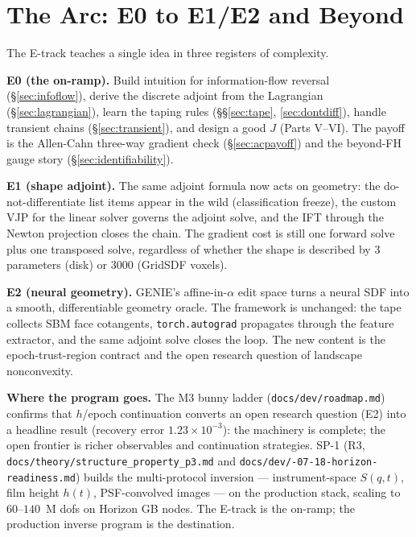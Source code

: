 \documentclass[11pt]{article}
\begin{document}
\section{The Arc: E0 to E1/E2 and Beyond}
\label{sec:arc}

The E-track teaches a single idea in three registers of complexity.

\textbf{E0 (the on-ramp).} Build intuition for information-flow reversal
(\S\ref{sec:infoflow}), derive the discrete adjoint from the Lagrangian
(\S\ref{sec:lagrangian}), learn the taping rules (\S\S\ref{sec:tape},
\ref{sec:dontdiff}), handle transient chains (\S\ref{sec:transient}), and
design a good $J$ (Parts V--VI).  The payoff is the Allen-Cahn three-way
gradient check (\S\ref{sec:acpayoff}) and the beyond-FH gauge story
(\S\ref{sec:identifiability}).

\textbf{E1 (shape adjoint).} The same adjoint formula now acts on geometry:
the do-not-differentiate list items appear in the wild (classification
freeze), the custom VJP for the linear solver governs the adjoint solve,
and the IFT through the Newton projection closes the chain.  The gradient
cost is still one forward solve plus one transposed solve, regardless of
whether the shape is described by 3 parameters (disk) or 3000 (GridSDF
voxels).

\textbf{E2 (neural geometry).} GENIE's affine-in-$\alpha$ edit space turns
a neural SDF into a smooth, differentiable geometry oracle.  The framework
is unchanged: the tape collects SBM face cotangents, \texttt{torch.autograd}
propagates through the feature extractor, and the same adjoint solve closes
the loop.  The new content is the epoch-trust-region contract and the open
research question of landscape nonconvexity.

\textbf{Where the program goes.} The M3 bunny ladder
(\texttt{docs/dev/roadmap.md}) confirms that $h$/epoch continuation
converts an open research question (E2) into a headline result (recovery
error $1.23 \times 10^{-3}$): the machinery is complete; the open frontier
is richer observables and continuation strategies.  SP-1 (R3,
\texttt{docs/theory/\allowbreak structure\_property\_p3.md} and
\texttt{docs/dev/-07-18-horizon-readiness.md}) builds the multi-protocol
inversion --- instrument-space $S(q,t)$, film height $h(t)$, PSF-convolved
images --- on the production stack, scaling to $60$--$140$~M dofs on Horizon
GB nodes.  The E-track is the on-ramp; the production inverse program is
the destination.
\end{document}
